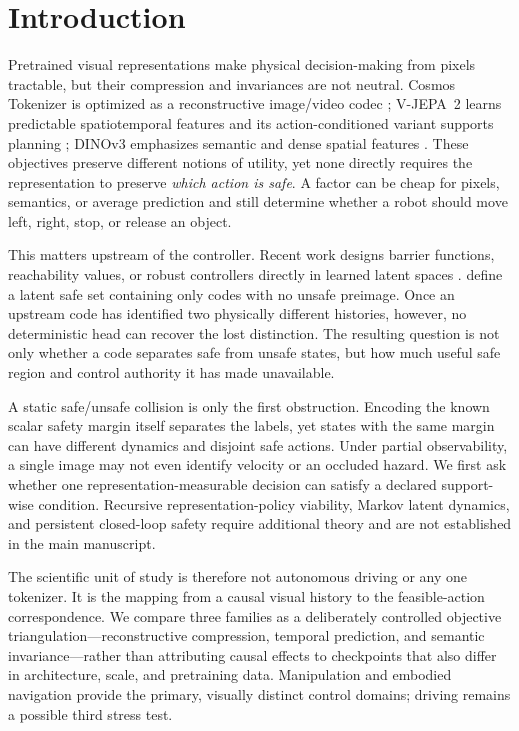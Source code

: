 \section{Introduction}

Pretrained visual representations make physical decision-making from pixels tractable, but their
compression and invariances are not neutral.  Cosmos Tokenizer is optimized as a reconstructive
image/video codec \citep{nvidia2025cosmos,nvidia2025cosmostokenizer}; V-JEPA~2 learns predictable
spatiotemporal features and its action-conditioned variant supports planning
\citep{assran2025vjepa2,murlabadia2026vjepa21}; DINOv3 emphasizes semantic and dense spatial
features \citep{simeoni2025dinov3}.  These objectives preserve different notions of utility, yet
none directly requires the representation to preserve \emph{which action is safe}.  A factor can
be cheap for pixels, semantics, or average prediction and still determine whether a robot should
move left, right, stop, or release an object.

This matters upstream of the controller.  Recent work designs barrier functions, reachability
values, or robust controllers directly in learned latent spaces
\citep{lutkus2025latent,anand2025safety,seo2025uncertainty,nath2026pixels}.  \citet{lutkus2025latent}
define a latent safe set containing only codes with no unsafe preimage.  Once an upstream code has
identified two physically different histories, however, no deterministic head can recover the
lost distinction.  The resulting question is not only whether a code separates safe from unsafe
states, but how much useful safe region and control authority it has made unavailable.

A static safe/unsafe collision is only the first obstruction.  Encoding the known scalar safety
margin itself separates the labels, yet states with the same margin can have different dynamics and
disjoint safe actions.  Under partial observability, a single image may not even identify velocity
or an occluded hazard.  We first ask whether one representation-measurable decision can satisfy a
declared support-wise condition.  Recursive representation-policy viability, Markov latent
dynamics, and persistent closed-loop safety require additional theory and are not established in
the main manuscript.

The scientific unit of study is therefore not autonomous driving or any one tokenizer.  It is the
mapping from a causal visual history to the feasible-action correspondence.  We compare three
families as a deliberately controlled objective triangulation---reconstructive compression,
temporal prediction, and semantic invariance---rather than attributing causal effects to checkpoints
that also differ in architecture, scale, and pretraining data.  Manipulation and embodied
navigation provide the primary, visually distinct control domains; driving remains a possible
third stress test.

